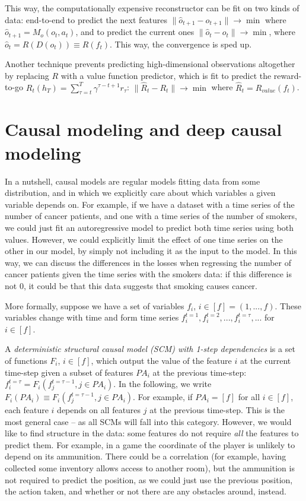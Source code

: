 \documentclass[a4paper,11pt,oneside]{report}
\begin{document}
This way, the computationally expensive reconstructor can be fit on two kinds of data: end-to-end to predict the next features $\|\hat{o}_{t+1}-o_{t+1}\|\to\min$ where $\hat{o}_{t+1}=M_o(o_t, a_t)$, and to predict the current ones $\|\hat{o}_t-o_t\|\to\min$, where $\hat{o}_t=R(D(o_t))\equiv R(f_t)$. This way, the convergence is sped up.

Another technique prevents predicting high-dimensional observations altogether by replacing $R$ with a value function predictor, which is fit to predict the reward-to-go $R_t(h_T)=\sum\limits_{\tau=t}^{T}\gamma^{\tau-t+1}r_{\tau}$:
$\|\hat{R}_t-R_t\|\to\min$ where $\hat{R}_t=R_{value}(f_t)$.


\section{Causal modeling and deep causal modeling}
\label{sec:causal}
In a nutshell, causal models are regular models fitting data from some distribution, and in which we explicitly care about which variables a given variable depends on. For example, if we have a dataset with a time series of the number of cancer patients, and one with a time series of the number of smokers, we could just fit an autoregressive model to predict both time series using both values. However, we could explicitly limit the effect of one time series on the other in our model, by simply not including it as the input to the model. In this way, we can discuss the differences in the losses when regressing the number of cancer patients given the time series with the smokers data: if this difference is not 0, it could be that this data suggests that smoking causes cancer.

More formally, suppose we have a set of variables $f_i$, $i\in[f]=(1, ..., f)$. These variables change with time and form time series $f_i^{t=1},f_i^{t=2},...,f_i^{t=\tau},...$ for $i\in[f]$.

A {\em deterministic structural causal model (SCM) with 1-step dependencies} is a set of functions $F_i$, $i\in[f]$, which output the value of the feature $i$ at the current time-step given a subset of features $PA_i$ at the previous time-step: $f_i^{t=\tau}=F_i(f_j^{t=\tau-1},j\in PA_i)$. In the following, we write $F_i(PA_i)\equiv F_i(f_j^{t=\tau-1},j\in PA_i)$. For example, if $PA_i=[f]$ for all $i\in[f]$, each feature $i$ depends on all features $j$ at the previous time-step. This is the most general case -- as all SCMs will fall into this category. However, we would like to find structure in the data: some features do not require {\em all} the features to predict them. For example, in a game the coordinate of the player is unlikely to depend on its ammunition. There could be a correlation (for example, having collected some inventory allows access to another room), but the ammunition is not required to predict the position, as we could just use the previous position, the action taken, and whether or not there are any obstacles around, instead.
\end{document}
